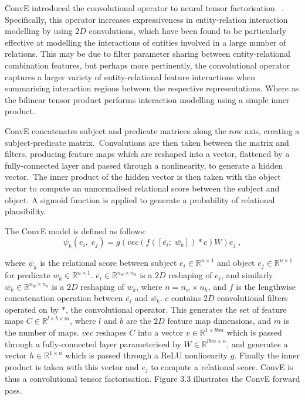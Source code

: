 ConvE introduced the convolutional operator to neural tensor factorisation \unskip ~\citep{dettmers2018convolutional}. Specifically, this operator increases expressiveness in entity-relation interaction modelling by using $ 2D $ convolutions, which have been found to be particularly effective at modelling the interactions of entities involved in a large number of relations. This may be due to filter parameter sharing between entity-relational combination features, but perhaps more pertinently, the convolutional operator captures a larger variety of entity-relational feature interactions when summarising interaction regions between the respective representations. Where as the bilinear tensor product performs interaction modelling using a simple inner product. \par

\noindent ConvE concatenates subject and predicate matrices along the row axis, creating a subject-predicate matrix.\ Convolutions are then taken between the matrix and filters, producing feature maps which are reshaped into a vector, flattened by a fully-connected layer and passed through a nonlinearity, to generate a hidden vector.\ The inner product of the hidden vector is then taken with the object vector to compute an unnormalised relational score between the subject and object. A sigmoid function is applied to generate a probability of relational plausibility. 

\noindent The ConvE model is defined as follows:
\begin{equation}
	\psi_k(e_i, \; e_j) = g(vec(f(\left [ \overline{e_i}; \; \overline{w_k} \right ]) * c)W )e_j \; ,
\end{equation}

\noindent where $ \psi_k $ is the relational score between subject $ e_i \in \mathbb{R}^{n \times 1} $ and object $ e_j \in \mathbb{R}^{n \times 1} $ for predicate $ w_k \in \mathbb{R}^{n \times 1} $. $ \overline{e_i} \in \mathbb{R}^{n_w \times n_h} $ is a $ 2D $ reshaping of $ e_i $, and similarly $ \overline{w_k} \in \mathbb{R}^{n_w \times n_h} $ is a $ 2D $ reshaping of $ w_k $, where $ n = n_w \times n_h $, and $ f $ is the lengthwise concatenation operation between $ \overline{e_i} $ and $ \overline{w_k} $. $ c $ contains $ 2D $ convolutional filters operated on by $ * $, the convolutional operator. This generates the set of feature maps $ C \in \mathbb{R}^{l \times b \times m} $, where $ l $ and $ b $ are the $ 2D $ feature map dimensions, and $ m $ is the number of maps. $ vec $ reshapes $ C $ into a vector $ v \in \mathbb{R}^{1 \times lbm} $ which is passed through a fully-connected layer parameterised by $ W \in \mathbb{R}^{lbm \times n} $, and generates a vector $ h \in \mathbb{R}^{1 \times n} $ which is passed through a ReLU nonlinearity $ g $. Finally the inner product is taken with this vector and $ e_j $ to compute a relational score. ConvE is thus a convolutional tensor factorisation. Figure 3.3 illustrates the ConvE forward pass.

